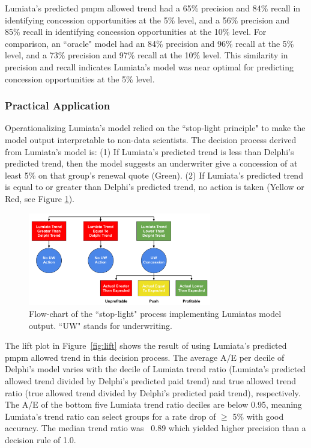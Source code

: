 \documentclass[letterpaper]{article} %
\begin{document}
Lumiata's predicted pmpm allowed trend had a 65\% precision and 84\% recall in identifying concession opportunities at the 5\% level, and a 56\% precision and 85\% recall in identifying concession opportunities at the 10\% level. For comparison, an ``oracle" model had an 84\% precision and 96\% recall at the 5\% level, and a 73\% precision and 97\% recall at the 10\% level. This similarity in precision and recall indicates Lumiata's model was near optimal for predicting concession opportunities at the 5\% level. 
\subsubsection{Practical Application} Operationalizing Lumiata's model relied on the ``stop-light principle" to make the model output interpretable to non-data scientists. The decision process derived from Lumiata's model is: (1) If Lumiata's predicted trend is less than Delphi's predicted trend, then the model suggests an underwriter give a concession of at least 5\% on that group's renewal quote (Green).  
(2) If Lumiata's predicted trend is equal to or greater than Delphi's predicted trend, no action is taken (Yellow or Red, see Figure \ref{fig:stoplight}).

\begin{figure}[t]\begin{center}
  \includegraphics[width=80mm]{decision.pdf}
  \caption{Flow-chart of the ``stop-light" process implementing Lumiatas model output. ``UW" stands for underwriting.
}
  \label{fig:stoplight}
  \end{center}
\end{figure}

The lift plot in Figure~\ref{fig:lift} shows the result of using Lumiata's predicted pmpm allowed trend in this decision process. The average A/E per decile of Delphi's model varies with the decile of Lumiata trend ratio (Lumiata's predicted allowed trend divided by Delphi's predicted paid trend) and true allowed trend ratio (true allowed trend divided by Delphi's predicted paid trend), respectively. The A/E of the bottom five Lumiata trend ratio deciles are below 0.95, meaning Lumiata's trend ratio can select groups for a rate drop of $\ge$ 5\% with good accuracy. The median trend ratio was ~0.89 which yielded higher precision than a decision rule of 1.0.
\end{document}
